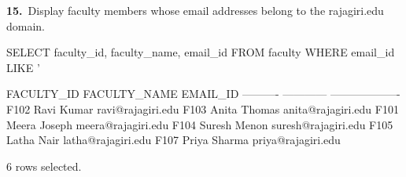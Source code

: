 \noindent\begin{minipage}{\linewidth}
\begingroup{}
{\fontsize{14}{17}\selectfont\textbf{15.}}\ Display faculty members whose email addresses belong to the rajagiri.edu domain.\par
\endgroup\vspace{12pt}


\begin{sqlcode}
SELECT faculty_id, faculty_name, email_id
FROM faculty WHERE email_id LIKE '%
\end{sqlcode}

\vspace{18pt}


\begin{sqlout}[fontsize=\small]
FACULTY_ID  FACULTY_NAME  EMAIL_ID           
----------  ------------  -------------------
F102        Ravi Kumar    ravi@rajagiri.edu
F103        Anita Thomas  anita@rajagiri.edu
F101        Meera Joseph  meera@rajagiri.edu
F104        Suresh Menon  suresh@rajagiri.edu
F105        Latha Nair    latha@rajagiri.edu
F107        Priya Sharma  priya@rajagiri.edu

6 rows selected.
\end{sqlout}
\end{minipage}\par\vspace{24pt}

